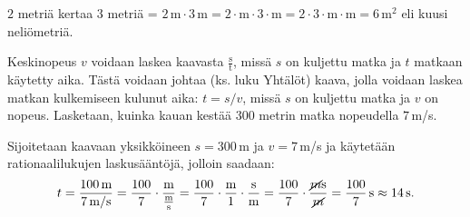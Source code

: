 \begin{esimerkki}
$2$ metriä kertaa $3$ metriä = $2\,\text{m} \cdot 3\,\text{m} = 2 \cdot \text{m} \cdot 3 \cdot \text{m}= 2 \cdot 3 \cdot \text{m} \cdot \text{m} =6\,\text{m}^2$ eli kuusi neliömetriä.
\end{esimerkki}

%
%
%	
%

%
%
%	


\begin{esimerkki}
Keskinopeus $v$ voidaan laskea kaavasta $\frac{\text{s}}{\text{t}}$, missä $s$ on kuljettu matka ja $t$ matkaan käytetty aika. Tästä voidaan johtaa (ks. luku Yhtälöt) kaava, jolla voidaan laskea matkan kulkemiseen kulunut aika: $t=s/v$, missä $s$ on kuljettu matka ja $v$ on nopeus. Lasketaan, kuinka kauan kestää $300$ metrin matka nopeudella $7$\,m/s.

Sijoitetaan kaavaan yksikköineen $s=300$\,m ja $v= 7$\,m/s ja käytetään rationaalilukujen laskusääntöjä, jolloin saadaan:
\[t=\frac{100\,\textrm{m}}{7\,\textrm{m/s}} = \frac{100}{7} \cdot \frac{\textrm{m}}{\frac{\textrm{m}}{\textrm{s}}} 
= \frac{100}{7} \cdot \frac{\textrm{m}}{1} \cdot \frac{\textrm{s}}{\textrm{m}}
= \frac{100}{7} \cdot \frac{\cancel{m}\textrm{s}}{\cancel{m}}
=\frac{100}{7}\,\textrm{s} \approx 14\,\textrm{s}.\]
\end{esimerkki}



